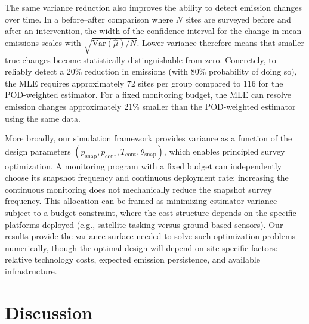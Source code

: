 \documentclass[unnumsec,webpdf,modern,mediumone]{oup-authoring-template}
\newcommand{\edit}[1]{{\color{magenta}#1}}
\begin{document}
The same variance reduction also improves the ability to detect emission changes over time. In a before--after comparison where $N$ sites are surveyed before and after an intervention, the width of the confidence interval for the change in mean emissions scales with $\sqrt{\mathrm{Var}(\hat{\mu})/N}$. Lower variance therefore means that smaller true changes become statistically distinguishable from zero. Concretely, to reliably detect a 20\% reduction in emissions (with 80\% probability of doing so), the MLE requires approximately \edit{72} sites per group compared to \edit{116} for the POD-weighted estimator. For a fixed monitoring budget, the MLE can resolve emission changes approximately \edit{21\%} smaller than the POD-weighted estimator using the same data.

More broadly, our simulation framework provides variance as a function of the design parameters $(p_{\text{snap}}, p_{\text{cont}}, T_{\text{cont}}, \theta_{\text{snap}})$, which enables principled survey optimization. A monitoring program with a fixed budget can independently choose its snapshot frequency and continuous deployment rate: increasing the continuous monitoring does not mechanically reduce the snapshot survey frequency. This allocation can be framed as minimizing estimator variance subject to a budget constraint, where the cost structure depends on the specific platforms deployed (e.g., satellite tasking versus ground-based sensors). Our results provide the variance surface needed to solve such optimization problems numerically, though the optimal design will depend on site-specific factors: relative technology costs, expected emission persistence, and available infrastructure.


\newpage

\section{Discussion}
\label{sec:discussion}
\end{document}
